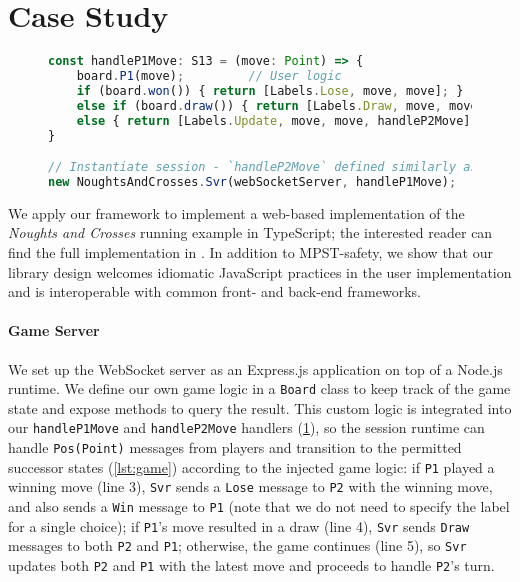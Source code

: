 \section{Case Study}
\label{section:example}

\begin{figure}
\begin{lstlisting}[language=JavaScript, tabsize=4]
const handleP1Move: S13 = (move: Point) => {
	board.P1(move);			// User logic
	if (board.won()) { return [Labels.Lose, move, move]; }
	else if (board.draw()) { return [Labels.Draw, move, move]; }
	else { return [Labels.Update, move, move, handleP2Move]; }
}

// Instantiate session - `handleP2Move` defined similarly as S18
new NoughtsAndCrosses.Svr(webSocketServer, handleP1Move);
\end{lstlisting}
\label{lst:svrprotocol}
\end{figure}

We apply our framework to implement a web-based implementation of the
\textit{Noughts and Crosses} running example in TypeScript;
the interested reader can find the full implementation in
\cite{NoughtsAndCrosses}.
In addition to MPST-safety, we show that our library design welcomes idiomatic
JavaScript practices in the user implementation and is interoperable with
common front- and back-end frameworks.

\paragraph{Game Server}
We set up the WebSocket server as an Express.js \cite{ExpressJS}
application on top of a Node.js \cite{NodeJS} runtime.
We define our own game logic in a \texttt{Board} class to keep track of the
game state and expose methods to query the result.
This custom logic is integrated into our \texttt{handleP1Move} and
\texttt{handleP2Move} handlers (\cref{lst:svrprotocol}), so the session runtime
can handle \texttt{Pos(Point)} messages from players and transition to the 
permitted successor states (\cref{lst:game}) according
to the injected game logic: if \texttt{P1} played a winning move (line 3), 
\texttt{Svr} sends a \texttt{Lose} message to \texttt{P2} with the winning 
move, and also sends a \texttt{Win} message to \texttt{P1} 
(note that we do not need to specify the label for a single choice); 
if \texttt{P1}'s move resulted 
in a draw (line 4), \texttt{Svr} sends \texttt{Draw} messages to 
both \texttt{P2} and \texttt{P1}; otherwise, the game continues (line 5), 
so \texttt{Svr} updates both \texttt{P2} and \texttt{P1} with the latest 
move and proceeds to handle \texttt{P2}'s turn.


